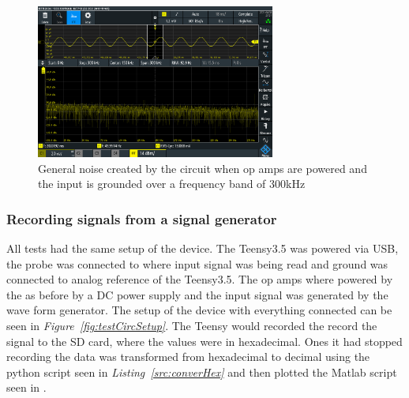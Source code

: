 \begin{figure}[h]
    \centering
    \includegraphics[width=0.7\textwidth]{graphics/NoiseFloor300k.PNG}
    \caption{General noise created by the circuit when op amps are powered and the input is grounded over a frequency band of 300kHz}
    \label{fig:noisefloor300k}
\end{figure}




\clearpage



\subsubsection{Recording signals from a signal generator}

All tests had the same setup of the device.
The Teensy3.5 was powered via USB, the probe was connected to where input signal was being read and ground was connected to analog reference of the Teensy3.5.
The op amps where powered by the as before by a DC power supply and the input signal was generated by the wave form generator.
The setup of the device with everything connected can be seen in \textit{Figure~\ref{fig:testCircSetup}}.
The Teensy would recorded the record the signal to the SD card, where the values were in hexadecimal.
Ones it had stopped recording the data was transformed from hexadecimal to decimal using the python script seen in \textit{Listing~\ref{src:converHex}} and then plotted the Matlab script seen in .

